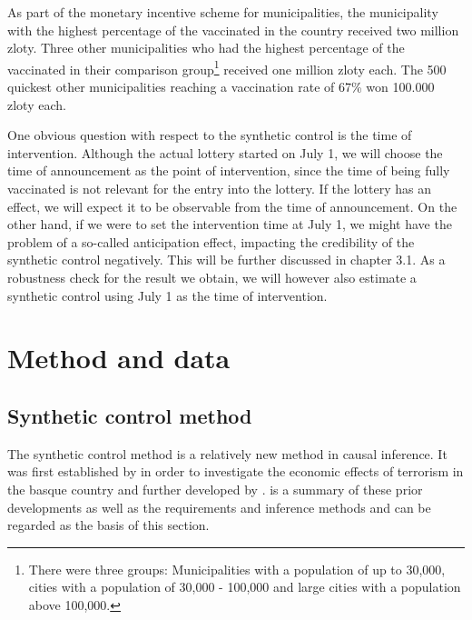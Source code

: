 \documentclass{scrbook}
\begin{document}
As part of the monetary incentive scheme for municipalities, the
municipality with the highest percentage of the vaccinated in the
country received two million zloty. Three other municipalities who had
the highest percentage of the vaccinated in their comparison
group\footnote{There were three groups: Municipalities with a population of up to 30,000, cities with a population of 30,000 - 100,000 and large cities with a population above 100,000.}
received one million zloty each. The 500 quickest other municipalities
reaching a vaccination rate of 67\% won 100.000 zloty each.

One obvious question with respect to the synthetic control is the time
of intervention. Although the actual lottery started on July 1, we will
choose the time of announcement as the point of intervention, since the
time of being fully vaccinated is not relevant for the entry into the
lottery. If the lottery has an effect, we will expect it to be
observable from the time of announcement. On the other hand, if we were
to set the intervention time at July 1, we might have the problem of a
so-called anticipation effect, impacting the credibility of the
synthetic control negatively. This will be further discussed in chapter
3.1. As a robustness check for the result we obtain, we will however
also estimate a synthetic control using July 1 as the time of
intervention.

\chapter{Method and data}

\section{Synthetic control method}

The synthetic control method is a relatively new method in causal
inference. It was first established by \textcite{abadie_economic_2003}
in order to investigate the economic effects of terrorism in the basque
country and further developed by \textcite{abadie_synthetic_2010}.
\textcite{abadie_using_2021} is a summary of these prior developments as
well as the requirements and inference methods and can be regarded as
the basis of this section.
\end{document}
